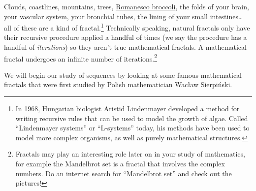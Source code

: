 Clouds, coastlines, mountains, trees, \href{https://www.google.com/search?q="romanesco+broccoli"&tbm=isch}{Romanesco broccoli}, the folds of your brain, your vascular system, your bronchial tubes, the lining of your small intestines\ldots{} all of these are a kind of fractal.\footnote{In 1968, Hungarian biologist Aristid Lindenmayer developed a method for writing recursive rules that can be used to model the growth of algae. Called ``Lindenmayer systems'' or ``L-systems'' today, his methods have been used to model more complex organisms, as well as purely mathematical structures.} Technically speaking, natural fractals only have their recursive procedure applied a handful of times (we say the procedure has a handful of \textit{iterations}) so they aren't true mathematical fractals. A mathematical fractal undergoes an infinite number of iterations.\footnote{Fractals may play an interesting role later on in your study of mathematics, for example the Mandelbrot set is a fractal that involves the complex numbers. Do an internet search for ``Mandelbrot set'' and check out the pictures!}

We will begin our study of sequences by looking at some famous mathematical fractals that were first studied by Polish mathematician Wac{\l}aw Sierpi\'nski.

\begin{boxedexplore}
\end{boxedexplore}

